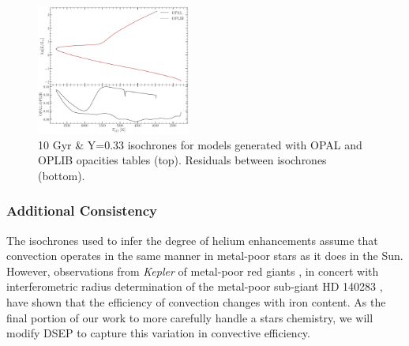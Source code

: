 \begin{figure}
	\centering
	\includegraphics[width=0.45\textwidth]{src/Figures/033ZIsosOPALOPLIB.pdf}
	\caption{10 Gyr \& Y=0.33 isochrones for models generated with OPAL and
	OPLIB opacities tables (top). Residuals between isochrones (bottom).}
	\label{fig:NGC2808ISO}
\end{figure}

\subsubsection{Additional Consistency}
The isochrones used to infer the degree of helium enhancements assume that
convection operates in the same manner in metal-poor stars as it does in the
Sun. However, observations from \textit{Kepler} of metal-poor red giants
\citep{Bonaca2012, tayar2017correlation}, in concert with interferometric
radius determination of the metal-poor sub-giant HD 140283
\citep{creevey2015benchmark}, have shown that the efficiency of convection
changes with iron content. As the final portion of our work to more carefully
handle a stars chemistry, we will modify DSEP to capture this variation in
convective efficiency. 
